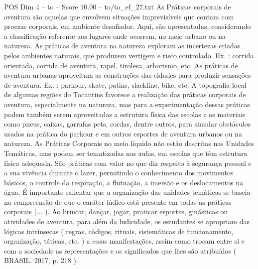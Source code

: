 \begin{textsample}{POS Dim 4 – to – Score 10.00 – to/to\_ef\_27.txt}
As Práticas corporais de aventura são aquelas que envolvem situações imprevisíveis que contam com proezas corporais, em ambiente desafiador.
Aqui, são apresentadas, considerando a classificação referente aos lugares onde ocorrem, no meio urbano ou na natureza.
As práticas de aventura na natureza exploram as incertezas criadas pelos ambientes naturais, que produzem vertigem e risco controlado.
Ex. : corrida orientada, corrida de aventura, rapel, tirolesa, arborismo, etc.
As práticas de aventura urbanas aproveitam as construções das cidades para produzir sensações de aventura.
Ex. : parkour, skate, patins, slackline, bike, etc.
A topografia local de algumas regiões do Tocantins favorece a realização das práticas corporais de aventura, especialmente na natureza, mas para a experimentação dessas práticas podem também serem aproveitadas a estrutura física das escolas e os materiais como pneus, caixas, garrafas pets, cordas, dentre outros, para simular obstáculos usados na prática do parkour e em outros esportes de aventura urbanos ou na natureza.
As Práticas Corporais no meio líquido não estão descritas nas Unidades Temáticas, mas podem ser tematizadas nas aulas, em escolas que têm estrutura física adequada.
São práticas com valor no que diz respeito à segurança pessoal e a sua vivência durante o lazer, permitindo o conhecimento dos movimentos básicos, o controle da respiração, a flutuação, a imersão e os deslocamentos na água.
É importante salientar que a organização das unidades temáticas se baseia na compreensão de que o caráter lúdico está presente em todas as práticas corporais (... ).
Ao brincar, dançar, jogar, praticar esportes, ginásticas ou atividades de aventura, para além da ludicidade, os estudantes se apropriam das lógicas intrínsecas ( regras, códigos, rituais, sistemáticas de funcionamento, organização, táticas, etc. ) a essas manifestações, assim como trocam entre si e com a sociedade as representações e os significados que lhes são atribuídos ( BRASIL, 2017, p. 218 ).

\end{textsample}
